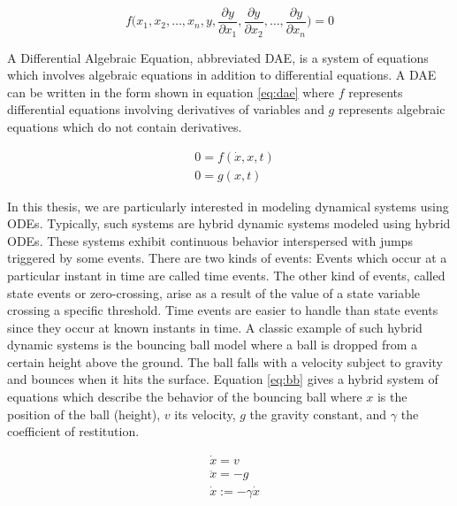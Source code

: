 \begin{equation}
f\biggl(x_1,x_2,\dots, x_n,y,\frac{\partial y}{\partial x_1},\frac{\partial y}{\partial x_2},\dots,\frac{\partial y}{\partial x_n}\biggl)=0
\label{eq:pde}
\end{equation} 

A Differential Algebraic Equation, abbreviated DAE, is a system of equations which involves algebraic equations in addition to differential equations. A DAE can be written in the form shown in equation \ref{eq:dae} where $f$ represents differential equations involving derivatives of variables and $g$ represents algebraic equations which do not contain derivatives.

\begin{equation}
\begin{aligned}
&0 = f(\dot{x},x,t)\\
&0 = g(x,t)
\end{aligned}
\label{eq:dae}
\end{equation} 
  
In this thesis, we are particularly interested in modeling dynamical systems using ODEs. Typically, such systems are hybrid dynamic systems modeled using hybrid ODEs. These systems exhibit continuous behavior interspersed with jumps triggered by some events. There are two kinds of events: Events which occur at a particular instant in time are called time events. The other kind of events, called state events or zero-crossing, arise as a result of the value of a state variable crossing a specific threshold. Time events are easier to handle than state events since they occur at known instants in time. A classic example of such hybrid dynamic systems is the bouncing ball model where a ball is dropped from a certain height above the ground. The ball falls with a velocity subject to gravity and bounces when it hits the surface. Equation \ref{eq:bb} gives a hybrid system of equations which describe the behavior of the bouncing ball where $x$ is the position of the ball (height), $v$ its velocity, $g$ the gravity constant, and $\gamma$ the coefficient of restitution.

\begin{equation}
\begin{aligned}
&\dot{x} = v\\
&\ddot{x} = -g\\
&\dot{x} := -\gamma \dot{x} 
\end{aligned}
\label{eq:bb}
\end{equation}  

